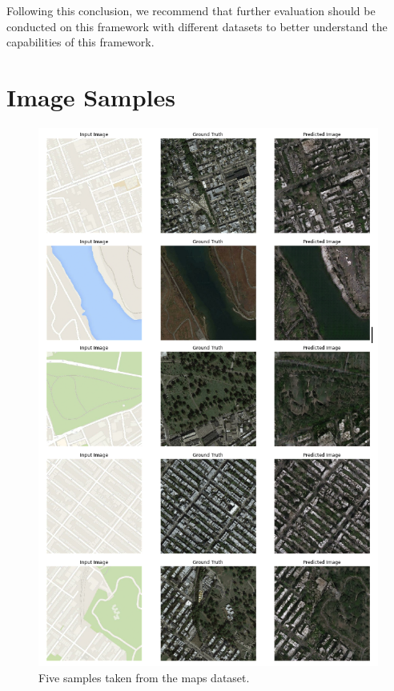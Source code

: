 \documentclass[peerreview]{IEEEtran}
\begin{document}
Following this conclusion, we recommend that further evaluation should be conducted on this framework with different datasets to better understand the capabilities of this framework.

\printbibliography


\appendices
\section{Image Samples} 
\begin{figure}[ht]
\centering
\includegraphics[width=0.6\columnwidth]{ex_maps.png} 
\caption{Five samples taken from the maps dataset.}
\label{fig:ex_maps}
\end{figure}
\end{document}
